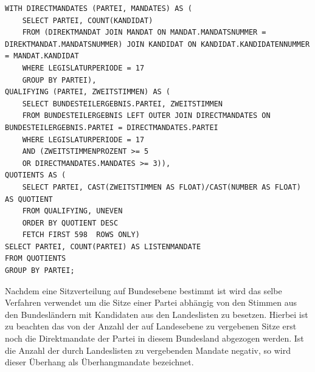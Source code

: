 \documentclass[a4paper]{article}
\begin{document}
\lstset{
language=SQL,
basicstyle=\footnotesize,       %
numbers=left,                   %
numberstyle=\footnotesize,      %
stepnumber=2,                   %
numbersep=5pt,                  %
showspaces=false,               %
showstringspaces=false,         %
frame=single,	                %
tabsize=2,	                %
captionpos=b,                   %
breaklines=true                %
}
\begin{lstlisting}[caption=Bestimmung der Listenmandate]
WITH DIRECTMANDATES (PARTEI, MANDATES) AS (
	SELECT PARTEI, COUNT(KANDIDAT)
	FROM (DIREKTMANDAT JOIN MANDAT ON MANDAT.MANDATSNUMMER = DIREKTMANDAT.MANDATSNUMMER) JOIN KANDIDAT ON KANDIDAT.KANDIDATENNUMMER = MANDAT.KANDIDAT
	WHERE LEGISLATURPERIODE = 17
	GROUP BY PARTEI),
QUALIFYING (PARTEI, ZWEITSTIMMEN) AS (
	SELECT BUNDESTEILERGEBNIS.PARTEI, ZWEITSTIMMEN    
	FROM BUNDESTEILERGEBNIS LEFT OUTER JOIN DIRECTMANDATES ON BUNDESTEILERGEBNIS.PARTEI = DIRECTMANDATES.PARTEI
	WHERE LEGISLATURPERIODE = 17
	AND (ZWEITSTIMMENPROZENT >= 5
	OR DIRECTMANDATES.MANDATES >= 3)),
QUOTIENTS AS (
	SELECT PARTEI, CAST(ZWEITSTIMMEN AS FLOAT)/CAST(NUMBER AS FLOAT) AS QUOTIENT
	FROM QUALIFYING, UNEVEN
	ORDER BY QUOTIENT DESC
	FETCH FIRST 598  ROWS ONLY)
SELECT PARTEI, COUNT(PARTEI) AS LISTENMANDATE
FROM QUOTIENTS
GROUP BY PARTEI;
\end{lstlisting}

Nachdem eine Sitzverteilung auf Bundesebene bestimmt ist wird das selbe Verfahren verwendet um die Sitze einer Partei abhängig von den Stimmen aus den Bundesländern mit Kandidaten aus den Landeslisten zu besetzen. Hierbei ist zu beachten das von der Anzahl der auf Landesebene zu vergebenen Sitze erst noch die Direktmandate der Partei in diesem Bundesland abgezogen werden. Ist die Anzahl der durch Landeslisten zu vergebenden Mandate negativ, so wird dieser Überhang als Überhangmandate bezeichnet.
\end{document}
